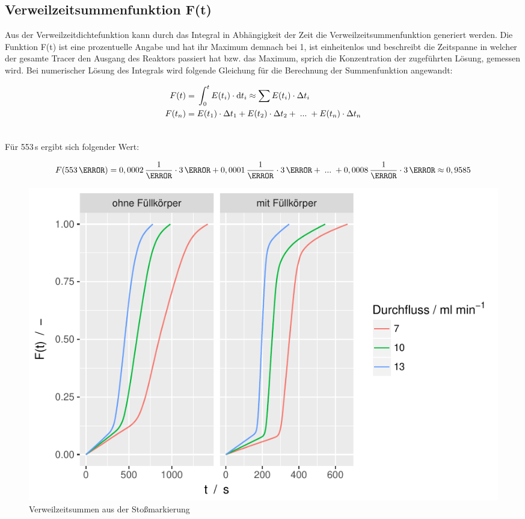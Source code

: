 \documentclass[12pt,liststotoc]{report}
\begin{document}

\subsection{Verweilzeitsummenfunktion F(t)}

Aus der Verweilzeitdichtefunktion kann durch das Integral in Abhängigkeit der Zeit die Verweilzeitsummenfunktion generiert werden. Die Funktion F(t) ist eine prozentuelle Angabe und hat ihr Maximum demnach bei 1, ist einheitenlos und beschreibt die Zeitspanne in welcher der gesamte Tracer den Ausgang des Reaktors passiert hat bzw. das Maximum, sprich die Konzentration der zugeführten Lösung, gemessen wird. Bei numerischer Lösung des Integrals wird folgende Gleichung für die Berechnung der Summenfunktion angewandt:

\begin{align}
F(t) =&\; \int_{0}^{t} E(t_i) \cdot \text{d} t_i \approx \sum E(t_i) \cdot \Delta t_i\\
F(t_n) =&\;E(t_1) \cdot \Delta t_1 + E(t_2) \cdot \Delta t_2+\;...\;+E(t_n) \cdot \Delta t_n\\\notag
\end{align}

Für 553\,s ergibt sich folgender Wert:

\begin{equation*}
F(553\,\s) =0,0002\,\frac{1}{\s}\cdot 3\,\s + 0,0001\,\frac{1}{\s}\cdot3\,\s+\;...\;+ 0,0008\,\frac{1}{\s} \cdot 3\,\s \approx 0,9585
\end{equation*} 

\begin{figure}[H]
\centering
\includegraphics[width=1\textwidth]{Graphics/F_stoss.pdf}
\caption[Verweilzeitsumme Stoßmarkierungen]{Verweilzeitsummen aus der Stoßmarkierung}
\label{summe_stoß}
\end{figure}
\noindent
\end{document}
